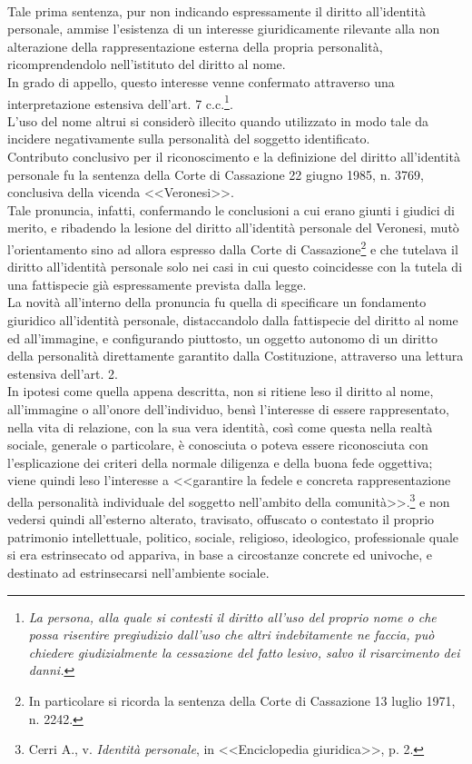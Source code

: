\\Tale prima sentenza, pur non indicando espressamente il diritto all'identità personale, ammise l'esistenza di un interesse giuridicamente rilevante alla non alterazione della rappresentazione esterna della propria personalità, ricomprendendolo nell'istituto del diritto al nome. 
\\In grado di appello, questo interesse venne confermato attraverso una interpretazione estensiva dell'art. 7 c.c.\footnote{\textit{La persona, alla quale si contesti il diritto all'uso del proprio nome o che possa risentire pregiudizio dall'uso che altri indebitamente ne faccia, può chiedere giudizialmente la cessazione del fatto lesivo, salvo il risarcimento dei danni.}}.
\\L'uso del nome altrui si considerò illecito quando utilizzato in modo tale da incidere negativamente sulla personalità del soggetto identificato. 
\\Contributo conclusivo per il riconoscimento e la definizione del diritto all'identità personale fu la sentenza della Corte di Cassazione 22  giugno  1985, n. 3769, conclusiva della vicenda <<Veronesi>>.
\\Tale pronuncia, infatti, confermando le conclusioni a cui erano giunti i giudici di merito, e ribadendo la lesione del diritto all’identità personale del Veronesi, mutò l’orientamento sino ad allora espresso dalla Corte di Cassazione\footnote{In particolare si ricorda la sentenza della Corte di Cassazione 13 luglio 1971, n. 2242.} e che tutelava il diritto all’identità personale solo nei casi in cui questo coincidesse con la tutela di una fattispecie già espressamente prevista dalla legge. 
\\La novità all'interno della pronuncia fu quella di specificare un fondamento giuridico all’identità personale, distaccandolo dalla fattispecie del diritto al nome ed all’immagine, e configurando piuttosto, un oggetto autonomo di un diritto della personalità direttamente garantito dalla Costituzione, attraverso una lettura estensiva dell'art. 2.
\\In ipotesi come quella appena descritta, non si ritiene leso il diritto al nome, all’immagine o all’onore dell’individuo, bensì l’interesse di essere rappresentato, nella vita di relazione, con la sua vera identità, così come questa nella realtà sociale, generale o particolare, è conosciuta o poteva essere riconosciuta con l'esplicazione dei criteri della normale diligenza e della buona fede oggettiva; viene quindi leso l'interesse a <<garantire la fedele e concreta rappresentazione della personalità individuale del soggetto nell'ambito della comunità>>.\footnote{Cerri A., v. \textit{Identità personale}, in <<Enciclopedia giuridica>>,  p. 2.} e non vedersi quindi all'esterno alterato, travisato, offuscato o contestato il proprio patrimonio intellettuale, politico, sociale, religioso, ideologico, professionale quale si era estrinsecato od appariva, in base a circostanze concrete ed univoche, e destinato ad estrinsecarsi nell'ambiente sociale. 
